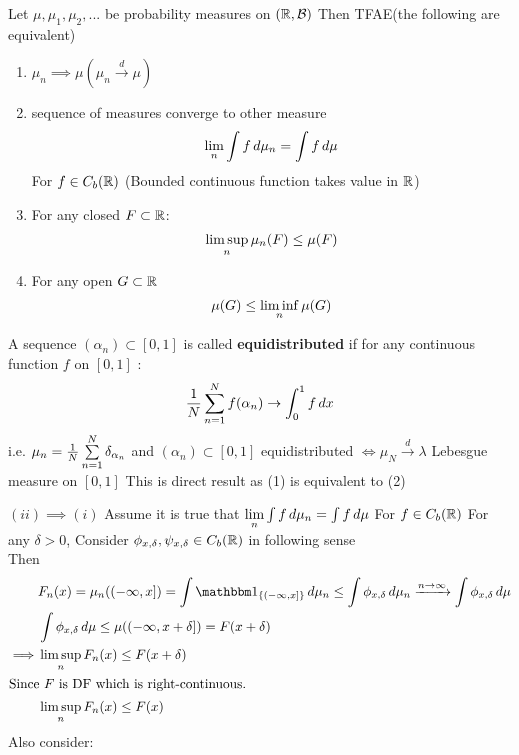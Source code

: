 \newpage
\begin{thm}
\label{Portmanteau}
Let $\mu, \mu_1, \mu_2, ...$ be probability measures on $(\mathbb{R}, \mathcal{B})$ Then TFAE(the following are equivalent)
\begin{enumerate}
    \item $\mu_n \implies \mu (\mu_n \xrightarrow{d} \mu)$
    \item sequence of measures converge to other measure \begin{equation*}
        \lim\limits_{n}\int f \mathop{}\!d\mu_n = \int f \mathop{}\!d\mu
    \end{equation*} For $f\in C_b(\mathbb{R})$ (Bounded continuous function takes value in $\mathbb{R}$)
    \item For any closed $F\subset \mathbb{R}$:
    \begin{equation*}
        \limsup\limits_{n} \mu_n(F) \leq \mu(F)
    \end{equation*}
    \item For any open $G\subset\mathbb{R}$
    \begin{equation*}
        \mu(G) \leq \liminf\limits_{n}\mu(G)
    \end{equation*}
\end{enumerate}
\end{thm}
\begin{rem}
A sequence $(\alpha_n) \subset [0,1]$ is called \textbf{equidistributed} if for any continuous function $f$ on $[0,1]$ :
\begin{equation*}
    \frac{1}{N}\sum\limits_{n=1}^N f(\alpha_n) \rightarrow \int_0^1 f \mathop{}\!d x 
\end{equation*} i.e. $\mu_n = \frac{1}{N}\sum\limits_{n=1}^N \delta_{\alpha_n}$ and $(\alpha_n)\subset [0,1]$ equidistributed $\Longleftrightarrow \mu_N\xrightarrow{d}\lambda$ Lebesgue measure on $[0,1]$ This is direct result as (1) is equivalent to (2)
\end{rem}
\newpage
\pf $(ii)\implies (i)$ Assume it is true that $\lim\limits_{n}\int f \mathop{}\!d\mu_n = \int f \mathop{}\!d\mu$ For $f\in C_b(\mathbb{R})$ For any $\delta >0$, Consider $\phi_{x,\delta},\psi_{x,\delta} \in C_b(\mathbb{R})$ in following sense
\vspace{2cm} \\
Then \begin{align*}
    &F_n(x) = \mu_n((-\infty, x])  = \int \I_{\{(-\infty, x]\}} \diff\mu_n \leq \int \phi_{x,\delta} \diff\mu_n \xrightarrow{n \rightarrow \infty} \int \phi_{x,\delta} \diff\mu \\
    &\int \phi_{x,\delta} \diff\mu \leq \mu((-\infty, x+\delta]) = F(x+\delta)\\
    \implies& \lsup{n}F_n(x) \leq F(x+\delta)\\
    \intertext{Since $F$ is DF which is right-continuous.}
    &\lsup{n}F_n(x) \leq F(x)
\end{align*} Also consider:
